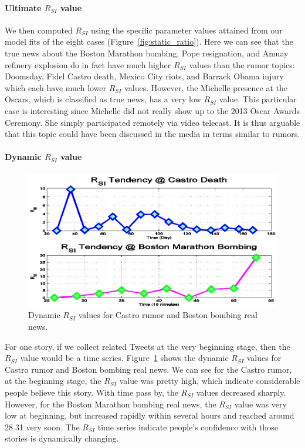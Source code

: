 \paragraph{Ultimate $R_{SI}$ value}
We then computed $R_{SI}$ using the specific parameter values attained from our model fits of the eight cases (Figure~\ref{fig:static_ratio}).
Here we can see that the true news about the Boston Marathon bombing, Pope resignation, and Amuay refinery explosion do in fact have much higher $R_{SI}$ values than the rumor topics: Doomsday, Fidel Castro death, Mexico City riots, and Barrack Obama injury which each have much lower $R_{SI}$ values. However, the Michelle presence at the Oscars, which is classified as true news, has a very low $R_{SI}$ value. This particular case is interesting since Michelle did not really show up to the 2013 Oscar Awards Ceremony. She simply participated remotely via video telecast. It is thus arguable that this topic could have been discussed in the media in terms similar to rumors.

\paragraph{Dynamic $R_{SI}$ value}

\begin{figure}[h]
\centering
  \includegraphics[width=4.5in]{pictures/Castro-Boston-realtime-RSI.png}
   \caption{Dynamic $R_{SI}$ values for Castro rumor and Boston bombing real news.}
  \label{fig:dynamic_castro_ratio}
\end{figure}

For one story, if we collect related Tweets at the very beginning stage, then the $R_{SI}$ value would be a time series. Figure~\ref{fig:dynamic_castro_ratio} shows the dynamic $R_{SI}$ values for Castro rumor and Boston bombing real news. We can see for the Castro rumor, at the beginning stage, the $R_{SI}$ value was pretty high, which indicate considerable people believe this story. With time pass by, the $R_{SI}$ values decreased sharply. However, for the Boston Marathon bombing real news, the $R_{SI}$ value was very low at beginning, but increased rapidly within several hours and reached around 28.31 very soon. The $R_{SI}$ time series indicate people's confidence with those stories is dynamically changing.


